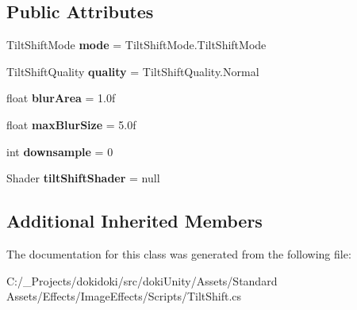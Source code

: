 \subsection*{Public Attributes}
\begin{DoxyCompactItemize}
\item 
Tilt\+Shift\+Mode {\bfseries mode} = Tilt\+Shift\+Mode.\+Tilt\+Shift\+Mode\hypertarget{class_unity_standard_assets_1_1_image_effects_1_1_tilt_shift_a7448aeb0fe5c22eab4b9bb25f338ac18}{}\label{class_unity_standard_assets_1_1_image_effects_1_1_tilt_shift_a7448aeb0fe5c22eab4b9bb25f338ac18}

\item 
Tilt\+Shift\+Quality {\bfseries quality} = Tilt\+Shift\+Quality.\+Normal\hypertarget{class_unity_standard_assets_1_1_image_effects_1_1_tilt_shift_a3336504f4de0dbb94802f0d78eb27bbc}{}\label{class_unity_standard_assets_1_1_image_effects_1_1_tilt_shift_a3336504f4de0dbb94802f0d78eb27bbc}

\item 
float {\bfseries blur\+Area} = 1.\+0f\hypertarget{class_unity_standard_assets_1_1_image_effects_1_1_tilt_shift_aeaf9de7829b263b96b1469b85d975fcc}{}\label{class_unity_standard_assets_1_1_image_effects_1_1_tilt_shift_aeaf9de7829b263b96b1469b85d975fcc}

\item 
float {\bfseries max\+Blur\+Size} = 5.\+0f\hypertarget{class_unity_standard_assets_1_1_image_effects_1_1_tilt_shift_a4f5be3f7fffdb90e6b0be07a7ab30308}{}\label{class_unity_standard_assets_1_1_image_effects_1_1_tilt_shift_a4f5be3f7fffdb90e6b0be07a7ab30308}

\item 
int {\bfseries downsample} = 0\hypertarget{class_unity_standard_assets_1_1_image_effects_1_1_tilt_shift_a9efad9acdbd012870ef6d8fc8ee424da}{}\label{class_unity_standard_assets_1_1_image_effects_1_1_tilt_shift_a9efad9acdbd012870ef6d8fc8ee424da}

\item 
Shader {\bfseries tilt\+Shift\+Shader} = null\hypertarget{class_unity_standard_assets_1_1_image_effects_1_1_tilt_shift_ab5f08d9ebd9012a4e26bbf6e711a0cf7}{}\label{class_unity_standard_assets_1_1_image_effects_1_1_tilt_shift_ab5f08d9ebd9012a4e26bbf6e711a0cf7}

\end{DoxyCompactItemize}
\subsection*{Additional Inherited Members}


The documentation for this class was generated from the following file\+:\begin{DoxyCompactItemize}
\item 
C\+:/\+\_\+\+Projects/dokidoki/src/doki\+Unity/\+Assets/\+Standard Assets/\+Effects/\+Image\+Effects/\+Scripts/Tilt\+Shift.\+cs\end{DoxyCompactItemize}
